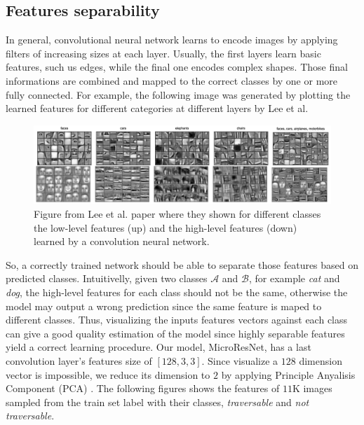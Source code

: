 \documentclass[../document.tex]{subfiles}
\begin{document}
\subsection{Features separability}
In general, convolutional neural network learns to encode images by applying filters of increasing sizes at each layer. Usually, the first layers learn basic features, such us edges, while the final one encodes complex shapes. Those final informations are combined and mapped to the correct classes by one or more fully connected. For example, the following image was generated by plotting the learned features for different categories at different layers by 
Lee et al. \cite{deepbelief}
\begin{figure}[H]
    \centering
    \includegraphics[width=\linewidth]{../img/5/deep_belief.png}
    \caption{Figure from Lee et al. \cite{deepbelief} paper where they shown for different classes the low-level features (up) and the high-level features (down) learned by a convolution neural network.}
\end{figure}
So, a correctly trained network should be able to separate those features based on predicted classes. Intuitivelly, given two classes $\mathcal{A}$ and $\mathcal{B}$, for example \emph{cat} and \emph{dog}, the high-level features for each class should not be the same, otherwise the model may output a wrong prediction since the same feature is maped to different classes. 
Thus, visualizing the inputs features vectors against each class can give a good quality estimation of the model since highly separable features yield a correct learning procedure.  Our model, MicroResNet, has a last convolution layer's features size of $[128, 3, 3 ]$. Since visualize a $128$ dimension vector is impossible, we reduce its dimension to $2$ by applying Principle Anyalisis Component (PCA) \cite{pca}. The following figures shows the features of $11$K images sampled from the train set label with their classes, \emph{traversable} and \emph{not traversable}.
\end{document}
